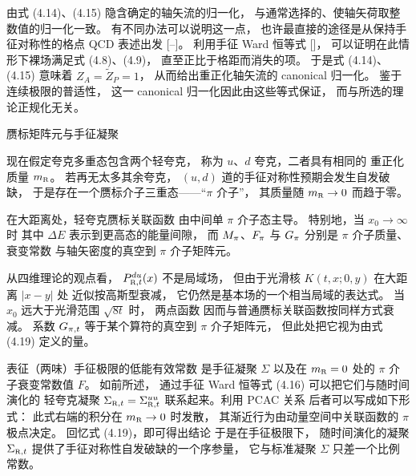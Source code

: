 由式 (4.14)、(4.15) 隐含确定的轴矢流的归一化，
与通常选择的、使轴矢荷取整数值的归一化一致。
有不同办法可以说明这一点，
也许最直接的途径是从保持手征对称性的格点 QCD 表述出发
[\cite{GinspargWilson}--\cite{ExactChSy}]。
利用手征 Ward 恒等式 [\cite{BoulderReview}]，
可以证明在此情形下裸场满足式 (4.8)、(4.9)，
直至正比于格距而消失的项。
于是式 (4.14)、(4.15) 意味着 $Z_A=\tilde{Z}_P=1$，
从而给出重正化轴矢流的 canonical 归一化。
鉴于连续极限的普适性，
这一 canonical 归一化因此由这些等式保证，
而与所选的理论正规化无关。


 赝标矩阵元与手征凝聚

现在假定夸克多重态包含两个轻夸克，
称为 $u$、$d$ 夸克，二者具有相同的
重正化质量 $\ren{m}$。
若再无太多其余夸克，
$(u,d)$ 道的手征对称性预期会发生自发破缺，
于是存在一个赝标介子三重态——``$\pi$ 介子''，
其质量随 $\ren{m}\to0$ 而趋于零。

在大距离处，轻夸克赝标关联函数
由中间单 $\pi$ 介子态主导。
特别地，当 $x_0\to\infty$ 时
其中 $\Delta E$ 表示到更高态的能量间隙，
而 $M_{\pi}$、$F_{\pi}$ 与 $G_{\pi}$
分别是 $\pi$ 介子质量、衰变常数
与轴矢密度的真空到 $\pi$ 介子矩阵元。

从四维理论的观点看，
$\rens{\Pax}{t}^{du}(x)$ 不是局域场，
但由于光滑核 $K(t,x;0,y)$ 在大距离 $|x-y|$ 处
近似按高斯型衰减，
它仍然是基本场的一个相当局域的表达式。
当 $x_0$ 远大于光滑范围 $\sqrt{8t}$ 时，
两点函数
因而与普通赝标关联函数按同样方式衰减。
系数 $G_{\pi,t}$ 等于某个算符的真空到 $\pi$ 介子矩阵元，
但此处把它视为由式 (4.19) 定义的量。

表征（两味）手征极限的低能有效常数
是手征凝聚 $\Sigma$
以及在 $\ren{m}=0$ 处的 $\pi$ 介子衰变常数值 $F$。
如前所述，
通过手征 Ward 恒等式 (4.16) 可以把它们与随时间演化的
轻夸克凝聚 $\rens{\Sigma}{t}=\rens{\Sigma}{t}^{uu}$
联系起来。利用 PCAC 关系
后者可以写成如下形式：
此式右端的积分在 $\ren{m}\to0$ 时发散，
其渐近行为由动量空间中关联函数的 $\pi$ 极点决定。
回忆式 (4.19)，即可得出结论
于是在手征极限下，
随时间演化的凝聚 $\rens{\Sigma}{t}$
提供了手征对称性自发破缺的一个序参量，
它与标准凝聚 $\Sigma$ 只差一个比例常数。

